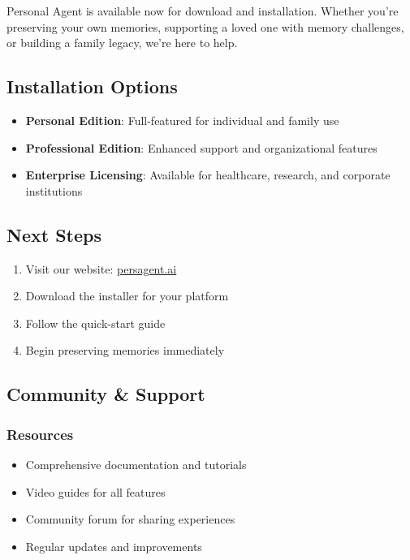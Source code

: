 \documentclass[11pt,letterpaper]{article}
\begin{document}
Personal Agent is available now for download and installation. Whether you're preserving your own memories, supporting a loved one with memory challenges, or building a family legacy, we're here to help.

\subsection{Installation Options}
\begin{itemize}[leftmargin=*]
    \item \textbf{Personal Edition}: Full-featured for individual and family use
    \item \textbf{Professional Edition}: Enhanced support and organizational features
    \item \textbf{Enterprise Licensing}: Available for healthcare, research, and corporate institutions
\end{itemize}

\subsection{Next Steps}
\begin{enumerate}
    \item Visit our website: \url{persagent.ai}
    \item Download the installer for your platform
    \item Follow the quick-start guide
    \item Begin preserving memories immediately
\end{enumerate}

\subsection{Community \& Support}

\subsubsection{Resources}
\begin{itemize}[leftmargin=*]
    \item Comprehensive documentation and tutorials
    \item Video guides for all features
    \item Community forum for sharing experiences
    \item Regular updates and improvements
\end{itemize}
\end{document}
